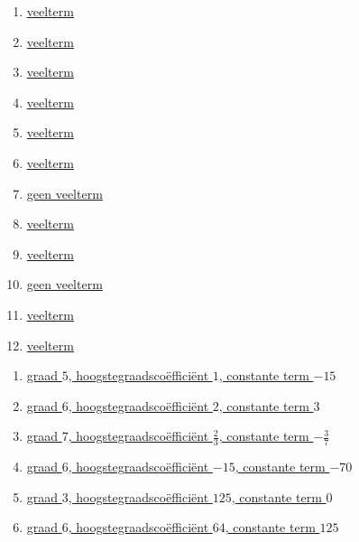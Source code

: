 \documentclass{ximera}
\begin{document}
\begin{Antwoord} \label{antw1.3}
\begin{enumerate}
\item
\hyperlink{oef1.3}{veelterm}
\item
\hyperlink{oef1.3}{veelterm}
\item
\hyperlink{oef1.3}{veelterm}
\item
\hyperlink{oef1.3}{veelterm}
\item
\hyperlink{oef1.3}{veelterm}
\item
\hyperlink{oef1.3}{veelterm}
\item
\hyperlink{oef1.3}{geen veelterm}
\item
\hyperlink{oef1.3}{veelterm}
\item
\hyperlink{oef1.3}{veelterm}
\item
\hyperlink{oef1.3}{geen veelterm}
\item
\hyperlink{oef1.3}{veelterm}
\item
\hyperlink{oef1.3}{veelterm}
\end{enumerate}
\setcounter{enumi}{4}
\end{Antwoord}


\begin{Antwoord} \label{antw1.5}
\begin{enumerate}
\item
\hyperlink{oef1.5}{graad $5$, hoogstegraadscoëfficiënt $1$, constante term $-15$}
\item
\hyperlink{oef1.5}{graad $6$, hoogstegraadscoëfficiënt $2$, constante term $3$}
\item
\hyperlink{oef1.5}{graad $7$, hoogstegraadscoëfficiënt $\frac{2}{3}$, constante term $-\frac{3}{7}$}
\item
\hyperlink{oef1.5}{graad $6$, hoogstegraadscoëfficiënt $-15$, constante term $-70$}
\item
\hyperlink{oef1.5}{graad $3$, hoogstegraadscoëfficiënt $125$, constante term $0$}
\item
\hyperlink{oef1.5}{graad $6$, hoogstegraadscoëfficiënt $64$, constante term $125$}
\end{enumerate}
\setcounter{enumi}{6}
\end{Antwoord}
\end{document}
